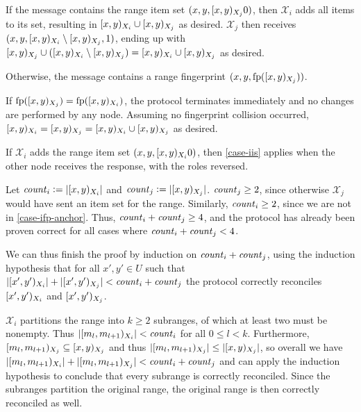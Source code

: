 \begin{caselist}
 \label{case-iis}  If the message contains the range item set $({x}, {y}, [{x},{y})_{X_j}{0})$, then $\mathcal{X}_i$ adds all items to its set, resulting in $[{x},{y})_{X_i} \cup [{x},{y})_{X_j}$ as desired. $\mathcal{X}_j$ then receives $({x}, {y}, {[{x},{y})_{X_i} \setminus [{x},{y})_{X_j}}, {1})$, ending up with $[{x},{y})_{X_j} \cup ([{x},{y})_{X_i} \setminus [{x},{y})_{X_j}) = [{x},{y})_{X_i} \cup [{x},{y})_{X_j}$ as desired.

 \label{case-ifp} Otherwise, the message contains a range fingerprint $({x}, {y}, {\operatorname{fp}([{x},{y})_{X_j})})$.

\begin{caselist}
 If $\operatorname{fp}([{x},{y})_{X_j}) = \operatorname{fp}([{x},{y})_{X_i})$, the protocol terminates immediately and no changes are performed by any node. Assuming no fingerprint collision occurred, $[{x},{y})_{X_i} = [{x},{y})_{X_j} = [{x},{y})_{X_i} \cup [{x},{y})_{X_j}$ as desired.

 \label{case-ifp-anchor} If $\mathcal{X}_i$ adds the range item set $({x}, {y}, [{x},{y})_{X_i}{0})$, then \cref{case-iis} applies when the other node receives the response, with the roles reversed.

\case[Recurse] Let $\mathit{count}_{i} \vcentcolon= |{[{x},{y})_{X_i}}|$ and $\mathit{count}_{j} \vcentcolon= |{[{x},{y})_{X_j}}|$. $\mathit{count}_{j} \geq 2$, since otherwise $\mathcal{X}_j$ would have sent an item set for the range. Similarly, $\mathit{count}_{i} \geq 2$, since we are not in \cref{case-ifp-anchor}. Thus, $\mathit{count}_{i} + \mathit{count}_{j} \geq 4$, and the protocol has already been proven correct for all cases where $\mathit{count}_{i} + \mathit{count}_{j} < 4$.

We can thus finish the proof by induction on $\mathit{count}_{i} + \mathit{count}_{j}$, using the induction hypothesis that for all $x', y' \in U$ such that $|{[{x'},{y'})_{X_i}}| + |{[{x'},{y'})_{X_j}}| < \mathit{count}_{i} + \mathit{count}_{j}$ the protocol correctly reconciles $[{x'},{y'})_{X_i}$ and $[{x'},{y'})_{X_j}$.

$\mathcal{X}_i$ partitions the range into $k \geq 2$ subranges, of which at least two must be nonempty.
Thus $|{[{m_l},{m_{l + 1}})_{X_i}}| < \mathit{count}_{i}$ for all $0 \leq l < k$.
Furthermore, $[{m_l},{m_{l + 1}})_{X_j} \subseteq [{x},{y})_{X_j}$ and thus $|{[{m_l},{m_{l + 1}})_{X_j}}| \leq |{[{x},{y})_{X_j}}|$, so overall we have $|{[{m_l},{m_{l + 1}})_{X_i}}| + |{[{m_l},{m_{l + 1}})_{X_j}}| < \mathit{count}_{i} + \mathit{count}_{j}$ and can apply the induction hypothesis to conclude that every subrange is correctly reconciled. Since the subranges partition the original range, the original range is then correctly reconciled as well.
\end{caselist}
\end{caselist}

